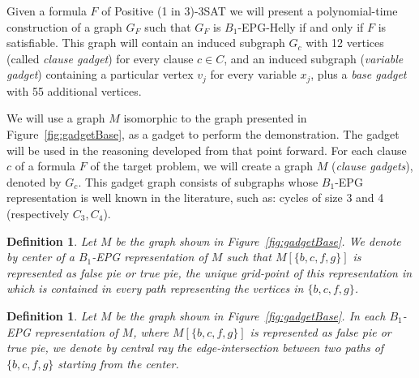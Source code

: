 \documentclass[a4paper,11pt]{article}
\newtheorem{defi}[theorem]{Definition}
\begin{document}
Given a formula $F$ of {\sc Positive (1 in 3)-3SAT} we will present a polynomial-time construction of a graph $ G_F$ such that $ G_F $ is $ B_1$-EPG-Helly if and only if $ F $ is satisfiable. This graph will contain an induced subgraph $ G_c$ with 12 vertices (called \emph {clause gadget}) for every clause $ c \in C $, and an induced subgraph (\emph {variable gadget}) containing a particular vertex  $ v_j$ for every variable $ x_j$, plus a \emph{base gadget}  with 55 additional vertices.

We will use a graph $M$ isomorphic to the graph presented in Figure~\ref{fig:gadgetBase}, as a gadget to perform the demonstration. The gadget will be used in the reasoning developed from that point forward. For each  clause $c$ of a formula $F$ of the target problem, we will create a  graph $M$ (\emph{clause gadgets}), denoted by $G_c$. This gadget graph consists of subgraphs whose $B_1$-EPG representation is well known in the literature, such as: cycles of size 3 and 4 (respectively $ C_3, C_4 $).

 


\begin{defi}
\label{lab:lab1}
Let $M$ be the graph shown in Figure~\ref{fig:gadgetBase}. We denote by \emph{center} of a $B_1$-EPG representation of $M$ such that $M[\{b, c, f, g \}]$ is represented as false pie or true pie, the unique grid-point of this representation in which is contained in every path representing the vertices in $ \{b, c, f, g \}$.
\end{defi}

\begin{defi}\citep{golumbic2009}
Let $M$ be the graph shown in Figure~\ref{fig:gadgetBase}. In each $B_1$-EPG representation of $M$, where $M[\{b, c, f, g \}]$ is represented as false pie or true pie, we denote by \emph {central ray} the edge-intersection  between two paths of $ \{b, c, f, g \} $ starting from the center.
\end{defi}
\end{document}
